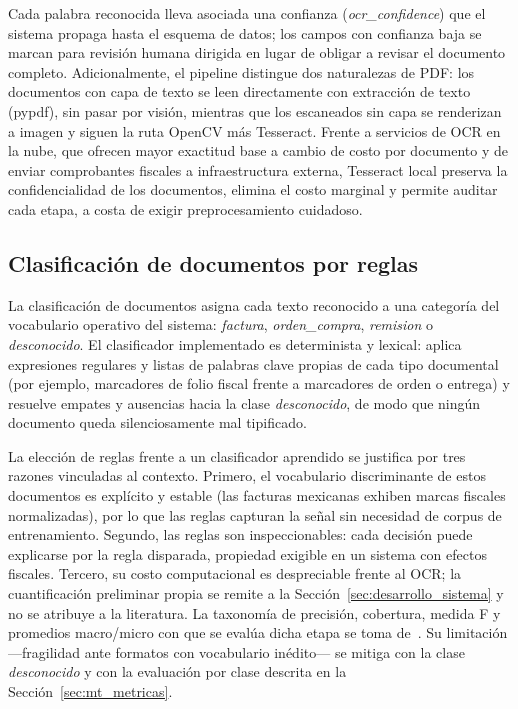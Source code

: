 Cada palabra reconocida lleva asociada una confianza (\textit{ocr\_confidence}) que el sistema propaga hasta el esquema de datos; los campos con confianza baja se marcan para revisión humana dirigida en lugar de obligar a revisar el documento completo\cite{tesseract_ocr}. Adicionalmente, el pipeline distingue dos naturalezas de PDF: los documentos con capa de texto se leen directamente con extracción de texto (pypdf), sin pasar por visión, mientras que los escaneados sin capa se renderizan a imagen y siguen la ruta OpenCV más Tesseract\cite{tesseract_ocr, opencv_docs}. Frente a servicios de OCR en la nube, que ofrecen mayor exactitud base a cambio de costo por documento y de enviar comprobantes fiscales a infraestructura externa, Tesseract local preserva la confidencialidad de los documentos, elimina el costo marginal y permite auditar cada etapa, a costa de exigir preprocesamiento cuidadoso\cite{gcp_document_ai, tesseract_ocr}.

\subsection{Clasificación de documentos por reglas} \label{sec:mt_clasificacion}

La clasificación de documentos asigna cada texto reconocido a una categoría del vocabulario operativo del sistema: \textit{factura}, \textit{orden\_compra}, \textit{remision} o \textit{desconocido}\cite{sokolova_metrics_2009}. El clasificador implementado es determinista y lexical: aplica expresiones regulares y listas de palabras clave propias de cada tipo documental (por ejemplo, marcadores de folio fiscal frente a marcadores de orden o entrega) y resuelve empates y ausencias hacia la clase \textit{desconocido}, de modo que ningún documento queda silenciosamente mal tipificado\cite{sokolova_metrics_2009, structured_extraction_2023}.

La elección de reglas frente a un clasificador aprendido se justifica por tres razones vinculadas al contexto. Primero, el vocabulario discriminante de estos documentos es explícito y estable (las facturas mexicanas exhiben marcas fiscales normalizadas), por lo que las reglas capturan la señal sin necesidad de corpus de entrenamiento\cite{sat_cfdi_2024}. Segundo, las reglas son inspeccionables: cada decisión puede explicarse por la regla disparada, propiedad exigible en un sistema con efectos fiscales\cite{sat_cfdi_validation_2023}. Tercero, su costo computacional es despreciable frente al OCR; la cuantificaci\'on preliminar propia se remite a la Secci\'on~\ref{sec:desarrollo_sistema} y no se atribuye a la literatura. La taxonom\'ia de precisi\'on, cobertura, medida F y promedios macro/micro con que se eval\'ua dicha etapa se toma de~\cite{sokolova_metrics_2009}. Su limitación —fragilidad ante formatos con vocabulario inédito— se mitiga con la clase \textit{desconocido} y con la evaluación por clase descrita en la Sección~\ref{sec:mt_metricas}\cite{structured_extraction_2023}.


